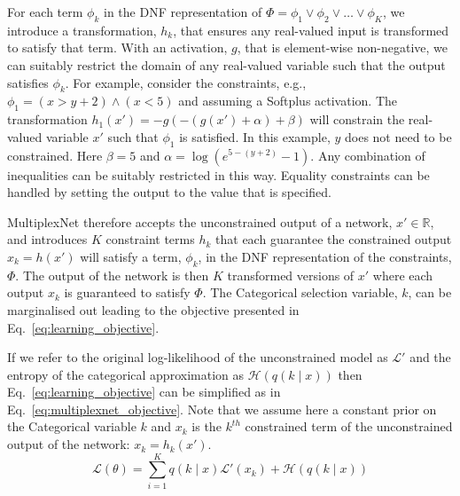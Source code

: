 \documentclass[letterpaper]{article} %
\begin{document}
For each term $\phi_k$ in the DNF representation of $\Phi = \phi_1 \lor \phi_2 \lor \dots \lor \phi_K$, we introduce a transformation, $h_k$, that ensures any real-valued input is transformed to satisfy that term.
With an activation, $g$, that is element-wise non-negative, we can suitably restrict the domain of any real-valued variable such that the output satisfies $\phi_k$.
For example, consider the constraints, e.g., $\phi_1 = \left( x > y + 2 \right) \land \left( x < 5 \right)$ and assuming a Softplus activation.
The transformation $h_1(x') = -g(-(g(x') + \alpha) + \beta)$ will constrain the real-valued variable $x'$ such that $\phi_1$ is satisfied. 
In this example, $y$ does not need to be constrained.
Here $\beta = 5$ and $\alpha = \log( e^{5 - (y + 2)} - 1)$.
Any combination of inequalities can be suitably restricted in this way.
Equality constraints can be handled by setting the output to the value that is specified.

MultiplexNet therefore accepts the unconstrained output of a network, $x' \in \mathbb{R}$, and introduces $K$ constraint terms $h_k$ that each guarantee the constrained output $x_k = h(x')$ will satisfy a term, $\phi_k$, in the DNF representation of the constraints, $\Phi$.
The output of the network is then $K$ transformed versions of $x'$ where each output $x_k$ is guaranteed to satisfy $\Phi$.
The Categorical selection variable, $k$, can be marginalised out leading to the objective presented in Eq.~\ref{eq:learning_objective}.

If we refer to the original log-likelihood of the unconstrained model as $\mathcal{L}'$ and the entropy of the categorical approximation as $\mathcal{H}(q(k\mid x))$ then  Eq.~\ref{eq:learning_objective} can be simplified as in Eq.~\ref{eq:multiplexnet_objective}. Note that we assume here a constant prior on the Categorical variable $k$ and $x_k$ is the $k^{th}$ constrained term of the unconstrained output of the network: $x_k = h_k(x')$. 
\begin{equation}
    \label{eq:multiplexnet_objective}
     \mathcal{L}(\theta) = \sum\limits_{i=1}^{K} q(k \mid x) \mathcal{L'}(x_k) + \mathcal{H}(q(k \mid x))
\end{equation}
\end{document}
